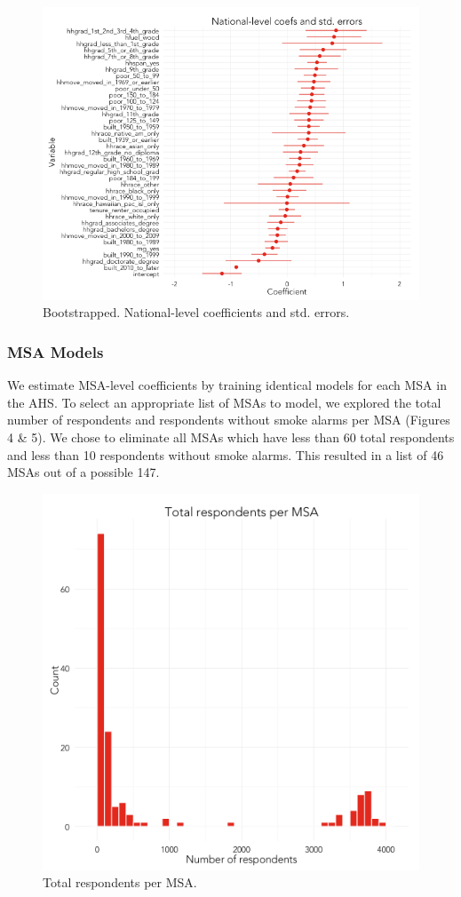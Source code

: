 \documentclass{sig-alternate}
\begin{document}
\begin{figure}
\centering 
\includegraphics[scale=0.36]{generate-model-2.png}
\caption{Bootstrapped. National-level coefficients and std. errors.}
\end{figure}

\subsubsection{MSA Models}
We estimate MSA-level coefficients by training identical models for each MSA in the AHS. To select an appropriate list of MSAs to model, we explored the total number of respondents and respondents without smoke alarms per MSA (Figures 4 & 5). We chose to eliminate  all MSAs which have less than 60 total respondents and less than 10 respondents without smoke alarms.  This resulted in a list of 46 MSAs out of a possible 147.

\begin{figure}
\centering 
\includegraphics[scale=0.42]{compute-msa-stats-histogram-1.png}
\caption{Total respondents per MSA.}
\end{figure}
\end{document}
